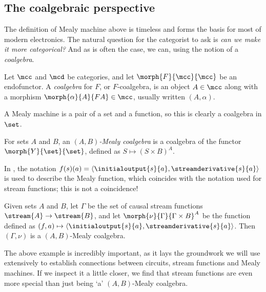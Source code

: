 \begin{example}
\end{example}

\subsection{The coalgebraic perspective}

The definition of Mealy machine above is timeless and forms the basis for most
of modern electronics.
The natural question for the categorist to ask is
\emph{can we make it more categorical?}
And as is often the case, we can, using the notion of a \emph{coalgebra}.

\begin{definition}[Coalgebra]
    Let \(\mcc\) and \(\mcd\) be categories, and let \(\morph{F}{\mcc}{\mcc}\)
    be an endofunctor.
    A \emph{coalgebra} for \(F\), or \(F\)-coalgebra, is an object
    \(A \in \mcc\) along with a morphism \(\morph{\alpha}{A}{FA} \in \mcc\),
    usually written \((A,\alpha)\).
\end{definition}

A Mealy machine is a pair of a set
and a function, so this is clearly a coalgebra in \(\set\).

\begin{definition}
    For sets \(A\) and \(B\), an \emph{\((A,B)\)-Mealy coalgebra} is a coalgebra
    of the functor \(\morph{Y}{\set}{\set}\), defined as
    \(S \mapsto (S \times B)^A\).
\end{definition}

\begin{example}
    In \cite{bonsangue2008coalgebraic}, the notation \(
    f(s)(a) = \langle{\initialoutput{s}{a},\streamderivative{s}{a}}\rangle
    \) is used to describe the Mealy function, which coincides with the notation
    used for stream functions; this is not a coincidence!

    Given sets \(A\) and \(B\), let \(\Gamma\) be the set of causal stream
    functions \(\stream{A} \to \stream{B}\), and let
    \(\morph{\nu}{\Gamma}{\Gamma \times B}^A\) be the function defined as \(
    (f, a) \mapsto \langle{\initialoutput{s}{a},\streamderivative{s}{a}}\rangle
    \).
    Then \((\Gamma,\nu)\) is a \((A,B)\)-Mealy coalgebra.
\end{example}

The above example is incredibly important, as it lays the groundwork we will
use extensively to establish connections between circuits, stream functions and
Mealy machines.
If we inspect it a little closer, we find that stream functions are even more
special than just being `a' \((A,B)\)-Mealy coalgebra.

